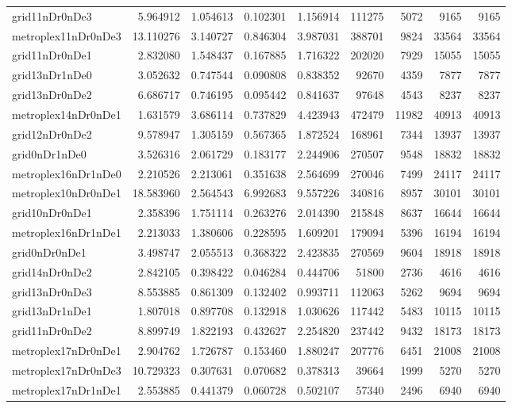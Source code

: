 \begin{longtable}{|l|r|r|r|r|r|r|r|r|}
grid11nDr0nDe3 & 5.964912 & 1.054613 & 0.102301 & 1.156914 & 111275 & 5072 & 9165 & 9165 \\
metroplex11nDr0nDe3 & 13.110276 & 3.140727 & 0.846304 & 3.987031 & 388701 & 9824 & 33564 & 33564 \\
grid11nDr0nDe1 & 2.832080 & 1.548437 & 0.167885 & 1.716322 & 202020 & 7929 & 15055 & 15055 \\
grid13nDr1nDe0 & 3.052632 & 0.747544 & 0.090808 & 0.838352 & 92670 & 4359 & 7877 & 7877 \\
grid13nDr0nDe2 & 6.686717 & 0.746195 & 0.095442 & 0.841637 & 97648 & 4543 & 8237 & 8237 \\
metroplex14nDr0nDe1 & 1.631579 & 3.686114 & 0.737829 & 4.423943 & 472479 & 11982 & 40913 & 40913 \\
grid12nDr0nDe2 & 9.578947 & 1.305159 & 0.567365 & 1.872524 & 168961 & 7344 & 13937 & 13937 \\
grid0nDr1nDe0 & 3.526316 & 2.061729 & 0.183177 & 2.244906 & 270507 & 9548 & 18832 & 18832 \\
metroplex16nDr1nDe0 & 2.210526 & 2.213061 & 0.351638 & 2.564699 & 270046 & 7499 & 24117 & 24117 \\
metroplex10nDr0nDe1 & 18.583960 & 2.564543 & 6.992683 & 9.557226 & 340816 & 8957 & 30101 & 30101 \\
grid10nDr0nDe1 & 2.358396 & 1.751114 & 0.263276 & 2.014390 & 215848 & 8637 & 16644 & 16644 \\
metroplex16nDr1nDe1 & 2.213033 & 1.380606 & 0.228595 & 1.609201 & 179094 & 5396 & 16194 & 16194 \\
grid0nDr0nDe1 & 3.498747 & 2.055513 & 0.368322 & 2.423835 & 270569 & 9604 & 18918 & 18918 \\
grid14nDr0nDe2 & 2.842105 & 0.398422 & 0.046284 & 0.444706 & 51800 & 2736 & 4616 & 4616 \\
grid13nDr0nDe3 & 8.553885 & 0.861309 & 0.132402 & 0.993711 & 112063 & 5262 & 9694 & 9694 \\
grid13nDr1nDe1 & 1.807018 & 0.897708 & 0.132918 & 1.030626 & 117442 & 5483 & 10115 & 10115 \\
grid11nDr0nDe2 & 8.899749 & 1.822193 & 0.432627 & 2.254820 & 237442 & 9432 & 18173 & 18173 \\
metroplex17nDr0nDe1 & 2.904762 & 1.726787 & 0.153460 & 1.880247 & 207776 & 6451 & 21008 & 21008 \\
metroplex17nDr0nDe3 & 10.729323 & 0.307631 & 0.070682 & 0.378313 & 39664 & 1999 & 5270 & 5270 \\
metroplex17nDr1nDe1 & 2.553885 & 0.441379 & 0.060728 & 0.502107 & 57340 & 2496 & 6940 & 6940 \\

\end{longtable}
